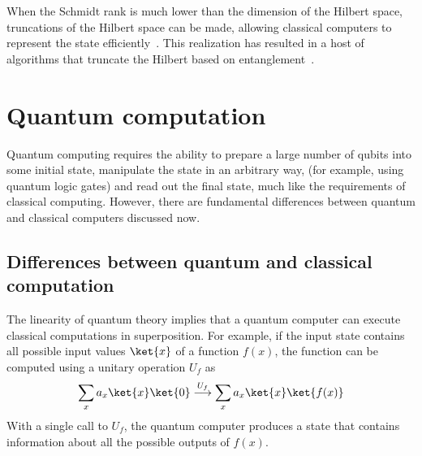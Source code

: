 \documentclass[11pt,oneside,final]{huthesis}%
\begin{document}
When the Schmidt rank is much lower than the dimension of the Hilbert space, truncations of the Hilbert space can be made, allowing classical computers to represent the state efficiently~\cite{Vidal03}.  This realization has resulted in a host of algorithms that truncate the Hilbert based on entanglement~\cite{Schollwock11,Chan08}. 


\section{Quantum computation}\label{sec:qc}

 Quantum computing requires the ability to prepare
a large number of qubits into some initial state, manipulate the state
in an arbitrary way, (for example, using quantum logic gates) and read
out the final state, much like the requirements of classical computing. However, there are fundamental differences between quantum and classical computers discussed now.

\subsection{Differences between quantum and classical computation}

The linearity of quantum theory implies that a quantum computer can execute
classical computations in superposition. For example, if the input state
contains all possible input values $\ket{x}$ of a function $f(x)$, the function
can be computed using a unitary operation $U_f$ as
\begin{equation}
\sum_x a_x \ket{x}\ket{0} \stackrel{U_f}{\longrightarrow} \sum_x a_x
\ket{x}\ket{f(x)}\label{eq:superposition}
\end{equation}
With a single call to $U_f$, the quantum computer produces a state that contains
information about all the possible outputs of $f(x)$.
\end{document}
